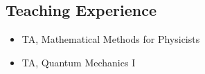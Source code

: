 \documentclass[margin,line,a4paper]{resume}
\begin{document}
\begin{resume}
\vspace{0.8em}

\section{\mysidestyle Teaching Experience}\vspace{1mm}

\begin{itemize}
    \item TA, Mathematical Methods for Physicists
    \item TA, Quantum Mechanics I
\end{itemize}








    


    
    
\end{resume}
\end{document}
